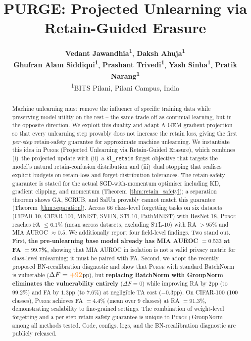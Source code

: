 \documentclass{article}
\title{PURGE: Projected Unlearning via Retain-Guided Erasure}
\author{
  \textbf{Vedant Jawandhia\textsuperscript{1}},
  \textbf{Daksh Ahuja\textsuperscript{1}} \\
  \textbf{Ghufran Alam Siddiqui\textsuperscript{1}},
  \textbf{Prashant Trivedi\textsuperscript{1}},
  \textbf{Yash Sinha\textsuperscript{1}},
  \textbf{Pratik Narang\textsuperscript{1}} \\
  \textsuperscript{1}BITS Pilani, Pilani Campus, India
}
\newcommand{\ours}{\textsc{Purge}}
\newcommand{\klr}{\texttt{kl\_retain}}
\newcommand{\new}[1]{{\color{orange}#1}}
\begin{document}
\maketitle

\begin{abstract}
\new{Machine unlearning must remove the influence of specific training data while preserving model utility on the rest -- the same trade-off as continual learning, but in the opposite direction. We exploit this duality and adapt A-GEM gradient projection so that every unlearning step provably does not increase the retain loss, giving the first \emph{per-step} retain-safety guarantee for approximate machine unlearning. We instantiate this idea in \ours{} (Projected Unlearning via Retain-Guided Erasure), which combines (i)~the projected update with (ii)~a \klr{} forget objective that targets the model's natural retain-confusion distribution and (iii)~dual stopping that realises explicit budgets on retain-loss and forget-distribution tolerances. The retain-safety guarantee is stated for the actual SGD-with-momentum optimiser including KD, gradient clipping, and momentum (Theorem~\ref{thm:retain_safety}); a separation theorem shows GA, SCRUB, and SalUn provably cannot match this guarantee (Theorem~\ref{thm:separation}). Across \new{66} class-level forgetting tasks on \new{six} datasets (CIFAR-10, \new{CIFAR-100,} MNIST, SVHN, STL10, PathMNIST) with ResNet-18, \ours{} reaches \new{FA $\le 6.1$\% (mean across datasets, excluding STL-10) with RA $> 95$\% and MIA AUROC $\approx 0.5$}.
We additionally report four field-level findings. Two stand out. First, \textbf{the pre-unlearning base model already has MIA AUROC $= 0.533$ at FA $= 99.7$\%}, showing that MIA AUROC in isolation is not a valid privacy metric for class-level unlearning; it must be paired with FA. Second, we adopt the recently proposed BN-recalibration diagnostic and show that \ours{} with standard BatchNorm is vulnerable ($\Delta F = \new{+92}$pp), but \textbf{replacing BatchNorm with GroupNorm eliminates the vulnerability entirely} ($\Delta F = 0$) while improving RA by $2$pp (to $99.2$\%) and FA by $1.3$pp (to $7.6$\%) at negligible TA cost ($-0.3$pp). \new{On CIFAR-100 (100 classes), \ours{} achieves FA $= 4.4$\% (mean over 9 classes) at RA $= 91.3$\%, demonstrating scalability to fine-grained settings.} The combination of weight-level forgetting and a per-step retain-safety guarantee is unique to \ours{}+GroupNorm among all methods tested. Code, configs, logs, and the BN-recalibration diagnostic are publicly released.}
\end{abstract}
\end{document}
